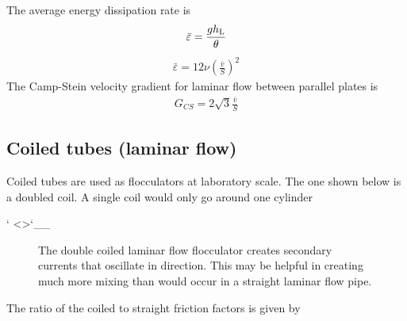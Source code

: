 \documentclass[letterpaper,10pt,english]{sphinxmanual}
\let\sphinxpxdimen\pdfpxdimen\else\newdimen\sphinxpxdimen
\begin{document}
The average energy dissipation rate is
\begin{equation}\label{equation:Rapid_Mix/RM_Derivations:Rapid_Mix/RM_Derivations:87}
\begin{split}\bar\varepsilon = \frac{gh_{\rm{L}}}{\theta}\end{split}
\end{equation}\begin{equation}\label{equation:Rapid_Mix/RM_Derivations:Rapid_Mix/RM_Derivations:88}
\begin{split}\bar\varepsilon = 12 \nu \left(\frac{  \bar v}{S} \right)^2\end{split}
\end{equation}
The Camp-Stein velocity gradient for laminar flow between parallel plates is
\begin{equation}\label{equation:Rapid_Mix/RM_Derivations:Rapid_Mix/RM_Derivations:89}
\begin{split}G_{CS} = 2\sqrt{3}\frac{  \bar v}{S}\end{split}
\end{equation}

\subsection{Coiled tubes (laminar flow)}
\label{\detokenize{Rapid_Mix/RM_Derivations:coiled-tubes-laminar-flow}}\label{\detokenize{Rapid_Mix/RM_Derivations:heading-coiled-tubes-laminar-flow}}
Coiled tubes are used as flocculators at laboratory scale. The one shown below is a doubled coil. A single coil would only go around one cylinder

{}` \textless{}\textgreater{}{}`\_\_

\begin{figure}[htbp]
\centering
\capstart

\noindent\sphinxincludegraphics[width=500\sphinxpxdimen]{{Coiled_tube_flocculator}.jpg}
\caption{The double coiled laminar flow flocculator creates secondary currents that oscillate in direction. This may be helpful in creating much more mixing than would occur in a straight laminar flow pipe.}\label{\detokenize{Rapid_Mix/RM_Derivations:id5}}\label{\detokenize{Rapid_Mix/RM_Derivations:figure-coiled-tube-flocculator}}\end{figure}

The ratio of the coiled to straight friction factors is given by 
\end{document}
